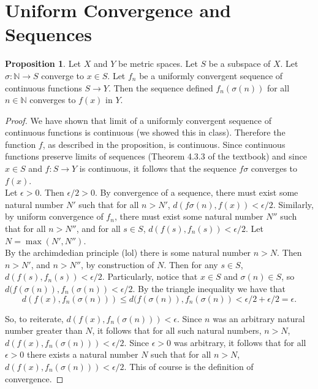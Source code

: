 \documentclass[11pt]{article}
\newcommand{\N}{\mathbb{N}}
\theoremstyle{definition}
\newtheorem{proposition}{Proposition}
\begin{document}
\section{Uniform Convergence and Sequences}

\begin{proposition}

Let $X$ and $Y$ be metric spaces. Let $S$ be a subspace of $X$. Let $\sigma:\N \to S$ converge to $x\in S$. Let $f_n$ be a uniformly convergent sequence of continuous functions $S\to Y$. Then the sequence defined $f_n(\sigma(n))$ for all $n\in \N$ converges to $f(x)$ in $Y$.
\end{proposition}

\begin{proof}
We have shown that limit of a uniformly convergent sequence of continuous functions is continuous (we showed this in class). Therefore the function $f$, as described in the proposition, is continuous. Since continuous functions preserve limits of sequences (Theorem 4.3.3 of the textbook) and since $x\in S$ and $f:S\to Y$ is continuous, it follows that the sequence $f\sigma$ converges to $f(x)$.\\

Let $\epsilon > 0$. Then $\epsilon/2 > 0$. By convergence of a sequence, there must exist some natural number $N'$ such that for all $n> N'$, $d(f\sigma(n), f(x) ) < \epsilon /2$. Similarly, by uniform convergence of $f_n$, there must exist some natural number $N''$ such that for all $n> N''$, and for all $s\in S$, $d(f(s), f_n(s)) < \epsilon/2$. Let $N = \max(N',N'')$.\\

By the archimdedian principle (lol) there is some natural number $n> N$. Then $n> N'$, and $n> N''$, by construction of $N$. Then for any $s\in S$, $d(f(s), f_n(s)) < \epsilon /2$. Particularly, notice that $x\in S$ and $\sigma(n)\in S$, so $ d(f(\sigma(n)), f_n(\sigma(n)) < \epsilon /2$. By the triangle inequality we have that 
\[ d(f(x), f_n(\sigma(n))) \le d(f(\sigma(n)), f_n(\sigma(n)) < \epsilon/2 + \epsilon/2 = \epsilon. \]

So, to reiterate, $d(f(x), f_n(\sigma(n))) < \epsilon$. Since $n$ was an arbitrary natural number greater than $N$, it follows that for all such natural numbers, $n > N$,  $d(f(x), f_n(\sigma(n))) < \epsilon/2$. Since $\epsilon > 0$ was arbitrary, it follows that for all $\epsilon > 0$ there exists a natural number $N$ such that for all $n> N$, $d(f(x), f_n(\sigma(n))) <\epsilon/2$. This of course is the definition of convergence.
\end{proof}
\end{document}
